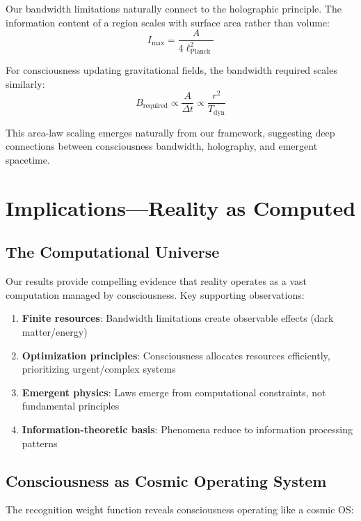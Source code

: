 \documentclass[twocolumn,prd,amsmath,amssymb,aps,superscriptaddress,nofootinbib]{revtex4-2}
\begin{document}
Our bandwidth limitations naturally connect to the holographic principle. The information content of a region scales with surface area rather than volume:
\begin{equation}
I_{\text{max}} = \frac{A}{4\ell_{\text{Planck}}^2}
\end{equation}

For consciousness updating gravitational fields, the bandwidth required scales similarly:
\begin{equation}
B_{\text{required}} \propto \frac{A}{\Delta t} \propto \frac{r^2}{T_{\text{dyn}}}
\end{equation}

This area-law scaling emerges naturally from our framework, suggesting deep connections between consciousness bandwidth, holography, and emergent spacetime.

\section{Implications---Reality as Computed}
\label{sec:implications}

\subsection{The Computational Universe}

Our results provide compelling evidence that reality operates as a vast computation managed by consciousness. Key supporting observations:

\begin{enumerate}
\item \textbf{Finite resources}: Bandwidth limitations create observable effects (dark matter/energy)
\item \textbf{Optimization principles}: Consciousness allocates resources efficiently, prioritizing urgent/complex systems
\item \textbf{Emergent physics}: Laws emerge from computational constraints, not fundamental principles
\item \textbf{Information-theoretic basis}: Phenomena reduce to information processing patterns
\end{enumerate}

\subsection{Consciousness as Cosmic Operating System}

The recognition weight function reveals consciousness operating like a cosmic OS:
\end{document}
